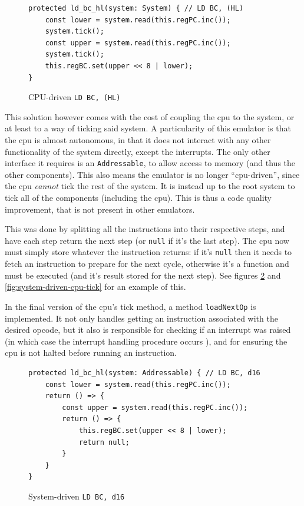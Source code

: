 \documentclass[11pt]{informatics-report}
\begin{document}
\begin{figure}[h]
    \begin{verbatim}
protected ld_bc_hl(system: System) { // LD BC, (HL)
    const lower = system.read(this.regPC.inc());
    system.tick();
    const upper = system.read(this.regPC.inc());
    system.tick();
    this.regBC.set(upper << 8 | lower);
}
    \end{verbatim}
    \caption{CPU-driven \texttt{LD BC, (HL)}}
    \label{fig:cpu-driven-ld}
\end{figure}

This solution however comes with the cost of coupling the \gls{cpu} to the system, or at least to a way of ticking said system. A particularity of this emulator is that the \gls{cpu} is almost autonomous, in that it does not interact with any other functionality of the system directly, except the interrupts. The only other interface it requires is an \texttt{Addressable}, to allow access to memory (and thus the other components). This also means the emulator is no longer ``\gls{cpu}-driven'', since the \gls{cpu} \textit{cannot} tick the rest of the system. It is instead up to the root system to tick all of the components (including the \gls{cpu}). This is thus a code quality improvement, that is not present in other emulators.

This was done by splitting all the instructions into their respective steps, and have each step return the next step (or \texttt{null} if it's the last step). The \gls{cpu} now must simply store whatever the instruction returns: if it's \texttt{null} then it needs to fetch an instruction to prepare for the next cycle, otherwise it's a function and must be executed (and it's result stored for the next step). See figures \ref{fig:system-driven-ld} and \ref{fig:system-driven-cpu-tick} for an example of this.

In the final version of the \gls{cpu}'s tick method, a method \texttt{loadNextOp} is implemented. It not only handles getting an instruction associated with the desired opcode, but it also is responsible for checking if an interrupt was raised (in which case the interrupt handling procedure occurs \cite[Interrupts]{pandoc}), and for ensuring the \gls{cpu} is not halted before running an instruction.

\begin{figure}[h]
    \begin{verbatim}
protected ld_bc_hl(system: Addressable) { // LD BC, d16
    const lower = system.read(this.regPC.inc());
    return () => {
        const upper = system.read(this.regPC.inc());
        return () => {
            this.regBC.set(upper << 8 | lower);
            return null;
        }
    }
}
    \end{verbatim}
    \caption{System-driven \texttt{LD BC, d16}}
    \label{fig:system-driven-ld}
\end{figure}
\end{document}
